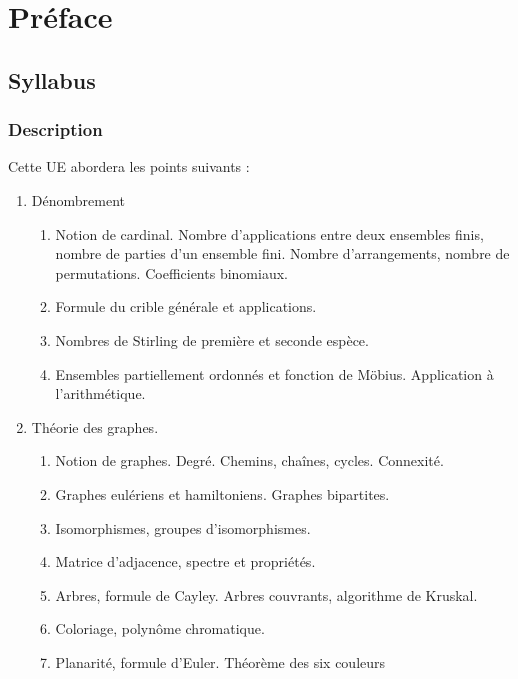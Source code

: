 
\chapter*{Préface}


\section*{Syllabus}

\subsection*{Description}

Cette UE abordera les points suivants :

\begin{enumerate}
	\item
	Dénombrement
	\begin{enumerate}
		\item
		Notion de cardinal. Nombre d'applications entre deux ensembles finis, 
		nombre de parties d'un ensemble fini.
		Nombre d'arrangements, nombre de permutations.
		Coefficients binomiaux.
		\item
		Formule du crible générale et applications.
		\item
		Nombres de Stirling de première et seconde espèce.
		\item
		Ensembles partiellement ordonnés et fonction de Möbius.
		Application à l'arithmétique.
	\end{enumerate}
	\item
	Théorie des graphes.
	\begin{enumerate}
		\item
		Notion de graphes. Degré. Chemins, chaînes, cycles. Connexité.
		\item
		Graphes eulériens et hamiltoniens. Graphes bipartites.
		\item
		Isomorphismes, groupes d'isomorphismes.
		\item
		Matrice d'adjacence, spectre et propriétés.
		\item
		Arbres, formule de Cayley. Arbres couvrants, algorithme de Kruskal.
		\item
		Coloriage, polynôme chromatique.
		\item
		Planarité, formule d'Euler. Théorème des six couleurs
	\end{enumerate}
\end{enumerate}

